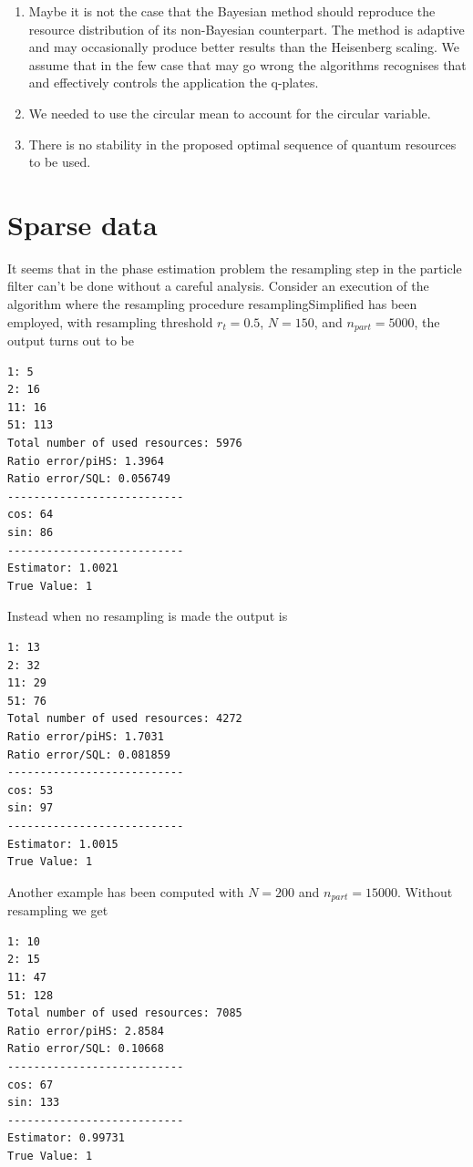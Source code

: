 \documentclass[aps, pra, 10pt, twocolumn, superscriptaddress,floatfix]{revtex4-1}
\begin{document}
\begin{enumerate}
\item Maybe it is not the case that the Bayesian method should reproduce the resource distribution of its non-Bayesian counterpart. The method is adaptive and may occasionally produce better results than the Heisenberg scaling. We assume that in the few case that may go wrong the algorithms recognises that and effectively controls the application the q-plates. 


\item We needed to use the circular mean to account for the circular variable.
	
\item There is no stability in the proposed optimal sequence of quantum resources to be used.

\end{enumerate}

\section{Sparse data}
It seems that in the phase estimation problem the resampling step in the particle filter can't be done without a careful analysis. Consider an execution of the algorithm where the resampling procedure resamplingSimplified has been employed, with resampling threshold $r_t= 0.5$, $N=150$, and $n_{part} = 5000$, the output turns out to be

\begin{verbatim}
1: 5
2: 16
11: 16
51: 113
Total number of used resources: 5976
Ratio error/piHS: 1.3964
Ratio error/SQL: 0.056749
---------------------------
cos: 64
sin: 86
---------------------------
Estimator: 1.0021
True Value: 1
\end{verbatim}

Instead when no resampling is made the output is

\begin{verbatim}
1: 13
2: 32
11: 29
51: 76
Total number of used resources: 4272
Ratio error/piHS: 1.7031
Ratio error/SQL: 0.081859
---------------------------
cos: 53
sin: 97
---------------------------
Estimator: 1.0015
True Value: 1
\end{verbatim}

Another example has been computed with $N = 200$ and $n_{part} = 15000$. Without resampling we get

\begin{verbatim}
1: 10
2: 15
11: 47
51: 128
Total number of used resources: 7085
Ratio error/piHS: 2.8584
Ratio error/SQL: 0.10668
---------------------------
cos: 67
sin: 133
---------------------------
Estimator: 0.99731
True Value: 1
\end{verbatim}
\end{document}
